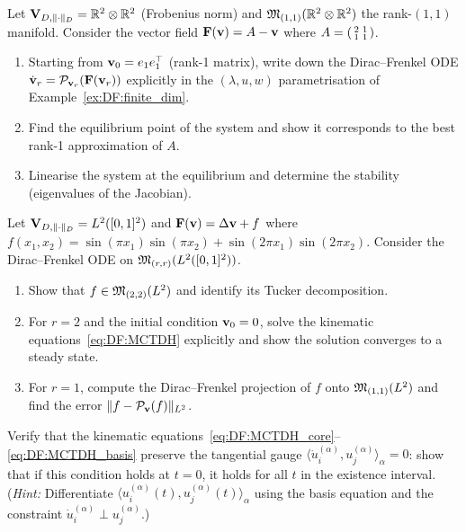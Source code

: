 \begin{exercise}
Let $\mathbf{V}_{D,\|\cdot\|_D} = \mathbb{R}^2 \otimes \mathbb{R}^2$ (Frobenius norm) and
$\mathfrak{M}_{(1,1)}(\mathbb{R}^2 \otimes \mathbb{R}^2)$ the rank-$(1,1)$ manifold.
Consider the vector field $\mathbf{F}(\mathbf{v}) = A - \mathbf{v}$ where
$A = \begin{psmallmatrix}2 & 1 \\ 1 & 1\end{psmallmatrix}$.
\begin{enumerate}
\item[\textup{(a)}] Starting from $\mathbf{v}_0 = e_1 e_1^\top$ (rank-1
    matrix), write down the Dirac--Frenkel ODE
    $\dot{\mathbf{v}}_r = \mathcal{P}_{\mathbf{v}_r}(\mathbf{F}(\mathbf{v}_r))$ explicitly in the
    $(\lambda, u, w)$ parametrisation of Example~\ref{ex:DF:finite_dim}.
\item[\textup{(b)}] Find the equilibrium point of the system and
    show it corresponds to the best rank-1 approximation of $A$.
\item[\textup{(c)}] Linearise the system at the equilibrium and
    determine the stability (eigenvalues of the Jacobian).
\end{enumerate}
\end{exercise}

\begin{exercise}
Let $\mathbf{V}_{D,\|\cdot\|_D} = L^2([0,1]^2)$ and $\mathbf{F}(\mathbf{v}) = \Delta\mathbf{v} + f$ where
$f(x_1,x_2) = \sin(\pi x_1)\sin(\pi x_2) + \sin(2\pi x_1)\sin(2\pi x_2)$.
Consider the Dirac--Frenkel ODE on $\mathfrak{M}_{(r,r)}(L^2([0,1]^2))$.
\begin{enumerate}
\item[\textup{(a)}] Show that $f \in \mathfrak{M}_{(2,2)}(L^2)$ and identify
    its Tucker decomposition.
\item[\textup{(b)}] For $r = 2$ and the initial condition
    $\mathbf{v}_0 = 0$, solve the kinematic equations~\eqref{eq:DF:MCTDH}
    explicitly and show the solution converges to a steady state.
\item[\textup{(c)}] For $r = 1$, compute the Dirac--Frenkel projection
    of $f$ onto $\mathfrak{M}_{(1,1)}(L^2)$ and find the error
    $\|f - \mathcal{P}_{\mathbf{v}}(f)\|_{L^2}$.
\end{enumerate}
\end{exercise}

\begin{exercise}
Verify that the kinematic equations~\eqref{eq:DF:MCTDH_core}--\eqref{eq:DF:MCTDH_basis}
preserve the tangential gauge $\langle \dot u^{(\alpha)}_i, u^{(\alpha)}_j
\rangle_\alpha = 0$: show that if this condition holds at $t=0$, it
holds for all $t$ in the existence interval. (\emph{Hint:} Differentiate
$\langle u^{(\alpha)}_i(t), u^{(\alpha)}_j(t)\rangle_\alpha$ using the
basis equation and the constraint $\dot u^{(\alpha)}_i \perp u^{(\alpha)}_j$.)
\end{exercise}

